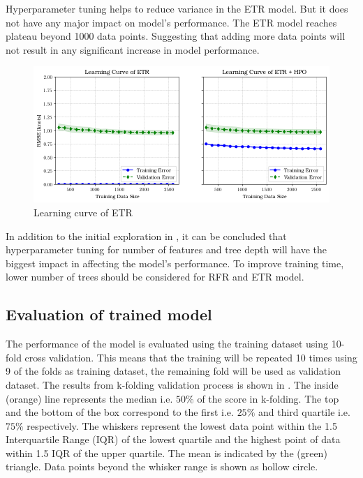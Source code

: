 Hyperparameter tuning helps to reduce variance in the ETR model. But it does not have any major impact on model's performance. The ETR model reaches plateau beyond 1000 data points. Suggesting that adding more data points will not result in any significant increase in model performance.\\

\begin{figure}[h]
    \centering
        \includegraphics[width=.95\textwidth]{02_figures/learning_curve_etr_rmse.png}
        \caption{Learning curve of ETR}
        \label{fig:learn_curve_ETR_RMSE}
\end{figure}

In addition to the initial exploration in , it can be concluded that hyperparameter tuning for number of features and tree depth will have the biggest impact in affecting the model's performance. To improve training time, lower number of trees should be considered for RFR and ETR model.\\


\subsection*{Evaluation of trained model}\label{sec:BBM_model_eval}

The performance of the model is evaluated using the training dataset using 10-fold cross validation. This means that the training will be repeated 10 times using 9 of the folds as training dataset, the remaining fold will be used as validation dataset. The results from k-folding validation process is shown in . The inside (orange) line represents the median i.e. $50\%$ of the score in k-folding. The top and the bottom of the box correspond to the first i.e. $25\%$ and third quartile i.e. $75\%$ respectively. The whiskers represent the lowest data point within the 1.5 Interquartile Range (IQR) of the lowest quartile and the highest point of data within 1.5 IQR of the upper quartile. The mean is indicated by the (green) triangle. Data points beyond the whisker range is shown as hollow circle.\\

